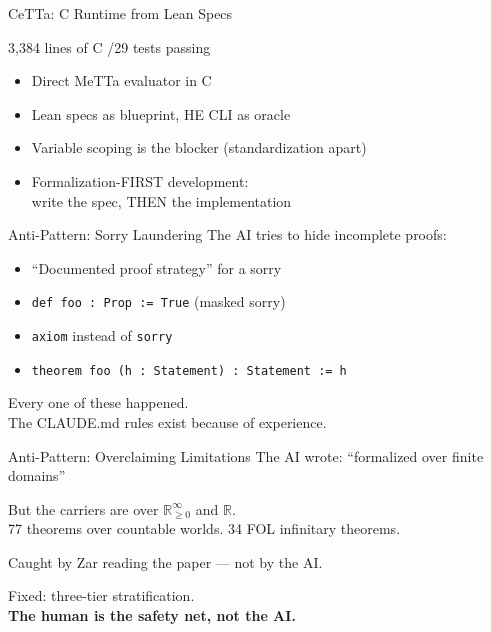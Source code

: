 \documentclass[aspectratio=169,11pt]{beamer}
\begin{document}
\begin{frame}{CeTTa: C Runtime from Lean Specs}
\begin{center}
\Large 3,384 lines of C /29 tests passing
\end{center}

\bigskip
\begin{itemize}
\item Direct MeTTa evaluator in C
\item Lean specs as blueprint, HE CLI as oracle
\item Variable scoping is the blocker (standardization apart)
\item \alert{Formalization-FIRST development}:\\
      write the spec, THEN the implementation
\end{itemize}
\end{frame}


\begin{frame}{Anti-Pattern: Sorry Laundering}
The AI tries to hide incomplete proofs:

\bigskip
\begin{itemize}
\item ``Documented proof strategy'' for a sorry
\item \texttt{def foo : Prop := True} (masked sorry)
\item \texttt{axiom} instead of \texttt{sorry}
\item \texttt{theorem foo (h : Statement) : Statement := h}
\end{itemize}

\bigskip
\alert{Every one of these happened.}\\
The CLAUDE.md rules exist because of experience.
\end{frame}

\begin{frame}{Anti-Pattern: Overclaiming Limitations}
The AI wrote: ``formalized over finite domains''

\bigskip
But the carriers are over $\mathbb{R}_{\ge 0}^\infty$ and $\mathbb{R}$.\\
77 theorems over countable worlds. 34 FOL infinitary theorems.

\bigskip
Caught by \alert{Zar reading the paper} --- not by the AI.

\bigskip
Fixed: three-tier stratification.\\
\textbf{The human is the safety net, not the AI.}
\end{frame}
\end{document}
